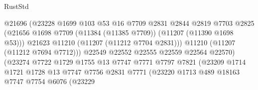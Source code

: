 \begin{lexlean}{RustStd}
\begin{coremodule}
                                        @21696
                                        (@23228
                                          @1699
                                          @103
                                          @53
                                          @16
                                          @7709
                                          @2831
                                          @2844
                                          @2819
                                          @7703
                                          @2825
                                          (@21656
                                            @1698
                                            @7709
                                            (@11384 (@11385 @7709))
                                            (@11207 (@11390 @1698 @53)))
                                          @21623
                                          @11210
                                          (@11207 (@11212 @7704 @2831)))
                                        @11210
                                        (@11207 (@11212 @7694 @7712)))
                                      @22549
                                      @22552
                                      @22555
                                      @22559
                                      @22564
                                      @22570)
                                    (@23274
                                      @7722
                                      @1729
                                      @1755
                                      @13
                                      @7747
                                      @7771
                                      @7797
                                      @7821
                                      (@23209
                                        @1714
                                        @1721
                                        @1728
                                        @13
                                        @7747
                                        @7756
                                        @2831
                                        @7771
                                        (@23220
                                          @1713
                                          @489
                                          @18163
                                          @7747
                                          @7754
                                          @6076
                                          (@23229

\end{coremodule}
\end{lexlean}
